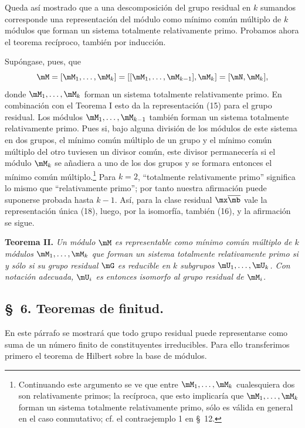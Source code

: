 \documentclass[11pt]{article}
\begin{document}
Queda así mostrado que a una descomposición del grupo residual en $k$ sumandos corresponde una representación del módulo como mínimo común múltiplo de $k$ módulos que forman un sistema totalmente relativamente primo. Probamos ahora el teorema recíproco, también por inducción.

Supóngase, pues, que
\[
 \mM=[\mM_1,\ldots,\mM_k]=[[\mM_1,\ldots,\mM_{k-1}],\mM_k]=[\mN,\mM_k],
\]
donde $\mM_1,\ldots,\mM_k$ forman un sistema totalmente relativamente primo. En combinación con el Teorema I esto da la representación (15) para el grupo residual. Los módulos $\mM_1,\ldots,\mM_{k-1}$ también forman un sistema totalmente relativamente primo. Pues si, bajo alguna división de los módulos de este sistema en dos grupos, el mínimo común múltiplo de un grupo y el mínimo común múltiplo del otro tuviesen un divisor común, este divisor permanecería si el módulo $\mM_k$ se añadiera a uno de los dos grupos y se formara entonces el mínimo común múltiplo.\footnote{Continuando este argumento se ve que entre $\mM_1,\ldots,\mM_k$ cualesquiera dos son relativamente primos; la recíproca, que esto implicaría que $\mM_1,\ldots,\mM_k$ forman un sistema totalmente relativamente primo, sólo es válida en general en el caso conmutativo; cf. el contraejemplo 1 en \S~12.} Para $k=2$, ``totalmente relativamente primo'' significa lo mismo que ``relativamente primo''; por tanto nuestra afirmación puede suponerse probada hasta $k-1$. Así, para la clase residual $\mx\overline{\mb}$ vale la representación única (18), luego, por la isomorfía, también (16), y la afirmación se sigue.

\textbf{Teorema II.} \emph{Un módulo $\mM$ es representable como mínimo común múltiplo de $k$ módulos $\mM_1,\ldots,\mM_k$ que forman un sistema totalmente relativamente primo si y sólo si su grupo residual $\mG$ es reducible en $k$ subgrupos $\mU_1,\ldots,\mU_k$. Con notación adecuada, $\mU_i$ es entonces isomorfo al grupo residual de $\mM_i$.}

\subsection*{\S~6. Teoremas de finitud.}

En este párrafo se mostrará que todo grupo residual puede representarse como suma de un número finito de constituyentes irreducibles. Para ello transferimos primero el teorema de Hilbert sobre la base de módulos.
\end{document}
